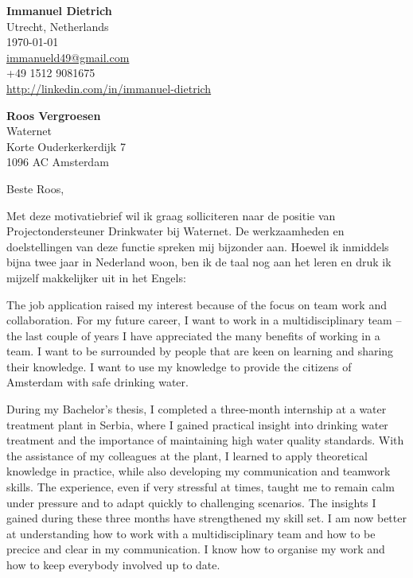 \documentclass[11pt]{report}
\begin{document}
 
\begin{titlepage}

    \begin{minipage}[t]{0.95\textwidth}
        \hfill
        \raggedleft
        \textbf{Immanuel Dietrich} \\
        Utrecht, Netherlands \\
        \today\\
        \href{mailto:immanueld49@gmail.com}{immanueld49@gmail.com} \\
        +49 1512 9081675 \\
        \url{http://linkedin.com/in/immanuel-dietrich}
    \end{minipage}

\raggedright \textbf{Roos Vergroesen} \\ Waternet \\ Korte Ouderkerkerdijk 7 \\  1096 AC Amsterdam \\ 

\vspace{0.7em}

\raggedright Beste Roos,\\


\vspace{0.7em}

Met deze motivatiebrief wil ik graag solliciteren naar de positie van Projectondersteuner Drinkwater bij Waternet. De werkzaamheden en doelstellingen van deze functie spreken mij bijzonder aan. 
Hoewel ik inmiddels bijna twee jaar in Nederland woon, ben ik de taal nog aan het leren en druk ik mijzelf makkelijker uit in het Engels:

\vspace{0.7em}

The job application raised my interest because of the focus on team work and collaboration. For my future career, I want to work in a multidisciplinary team -- the last couple of years I have appreciated the many benefits of working in a team. 
I want to be surrounded by people that are keen on learning and sharing their knowledge. I want to use my knowledge to provide the citizens of Amsterdam with safe drinking water. 

\vspace{0.7em}

During my Bachelor's thesis, I completed a three-month internship at a water treatment plant in Serbia, where I gained practical insight into drinking water treatment and the importance of maintaining high water quality standards. 
With the assistance of my colleagues at the plant, I learned to apply theoretical knowledge in practice, while also developing my communication and teamwork skills. The experience, even if very stressful at times, 
taught me to remain calm under pressure and to adapt quickly to challenging scenarios. The insights I gained during these three months have strengthened my skill set. I am now better at understanding how to work with a multidisciplinary team and 
how to be precice and clear in my communication. I know how to organise my work and how to keep everybody involved up to date. 


\end{titlepage}
\end{document}
